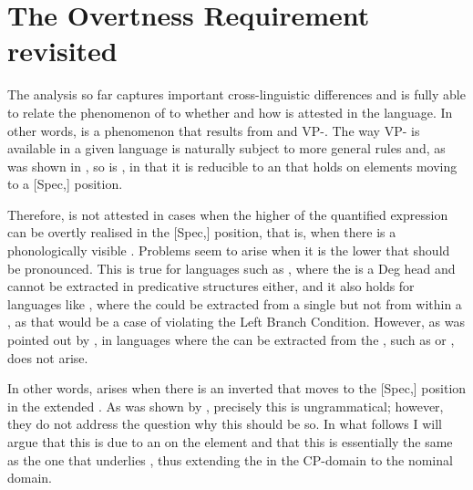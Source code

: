 \section{The Overtness Requirement revisited} \label{sec:4overtness}
The analysis so far captures important cross-linguistic differences and is fully able to relate the phenomenon of  to whether and how  is attested in the language. In other words,  is a phenomenon that results from  and VP-. The way VP- is available in a given language is naturally subject to more general rules and, as was shown in , so is , in that it is reducible to an  that holds on elements moving to a [Spec,] position.

Therefore,  is not attested in cases when the higher  of the quantified expression can be overtly realised in the [Spec,] position, that is, when there is a phonologically visible . Problems seem to arise when it is the lower  that should be pronounced. This is true for languages such as , where the  is a Deg head and cannot be extracted in predicative structures either, and it also holds for languages like , where the    could be extracted from a single  but not from within a , as that would be a case of violating the Left Branch Condition. However, as was pointed out by \citet{kennedymerchant2000}, in languages where the  can be extracted from the , such as  or ,  does not arise.

In other words,  arises when there is an inverted  that moves to the [Spec,] position in the extended . As was shown by \citet{kennedymerchant2000}, precisely this  is ungrammatical; however, they do not address the question why this should be so. In what follows I will argue that this is due to an  on the  element and that this  is essentially the same as the one that underlies , thus extending the  in the CP-domain to the nominal domain.

